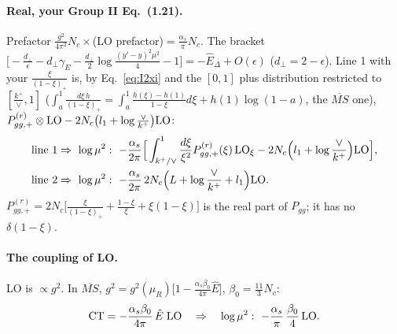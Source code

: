 \documentclass[10pt]{article}
\numberwithin{equation}{section}
\begin{document}
\paragraph{Real, your Group II Eq.~(1.21).} Prefactor $\frac{g^2}{4\pi^2}N_c\times$(LO prefactor)$=\frac{\alpha_s}{\pi}N_c$. The bracket $\big[-\frac{d_\perp}{\epsilon}-d_\perp\gamma_E-\frac{d_\perp}{2}\log\frac{(y'-y)^2\mu^2}{4}-1\big]=-\hat E_\Delta+O(\epsilon)$ ($d_\perp=2-\epsilon$). Line 1 with your $\frac{\xi}{(1-\xi)_+}$ is, by Eq.~\eqref{eq:I2xi} and the $[0,1]$ plus distribution restricted to $[\frac{k^+}{\vee},1]$ ($\int_a^1\frac{d\xi\,h}{(1-\xi)_+}=\int_a^1\frac{h(\xi)-h(1)}{1-\xi}d\xi+h(1)\log(1-a)$, the $\overline{MS}$ one), $P^{(r)}_{gg,+}\otimes{\rm LO}-2N_c\big(l_1+\log\frac{\vee}{k^+}\big){\rm LO}$:
\begin{align}
\text{line 1}&\Rightarrow\ \log\mu^2:\ -\frac{\alpha_s}{2\pi}\Big[\int_{k^+/\vee}^1\frac{d\xi}{\xi^2}P^{(r)}_{gg,+}(\xi)\,{\rm LO}_\xi-2N_c\Big(l_1+\log\frac{\vee}{k^+}\Big){\rm LO}\Big],\label{eq:muR1}\\
\text{line 2}&\Rightarrow\ \log\mu^2:\ -\frac{\alpha_s}{2\pi}\,2N_c\Big(L+\log\frac{\vee}{k^+}+l_1\Big){\rm LO}.\label{eq:muR2}
\end{align}
$P^{(r)}_{gg,+}=2N_c\big[\frac{\xi}{(1-\xi)_+}+\frac{1-\xi}{\xi}+\xi(1-\xi)\big]$ is the real part of $P_{gg}$; it has no $\delta(1-\xi)$.
\paragraph{The coupling of LO.} LO is $\propto g^2$. In $\overline{MS}$, $g^2=g^2(\mu_R)\big[1-\frac{\alpha_s\beta_0}{4\pi}\hat E\big]$, $\beta_0=\frac{11}{3}N_c$:
\begin{equation}
\text{CT}=-\frac{\alpha_s\beta_0}{4\pi}\,\hat E\;{\rm LO}\quad\Rightarrow\quad\log\mu^2:\ -\frac{\alpha_s}{\pi}\,\frac{\beta_0}{4}\,{\rm LO}.
\label{eq:ct}
\end{equation}
\end{document}
